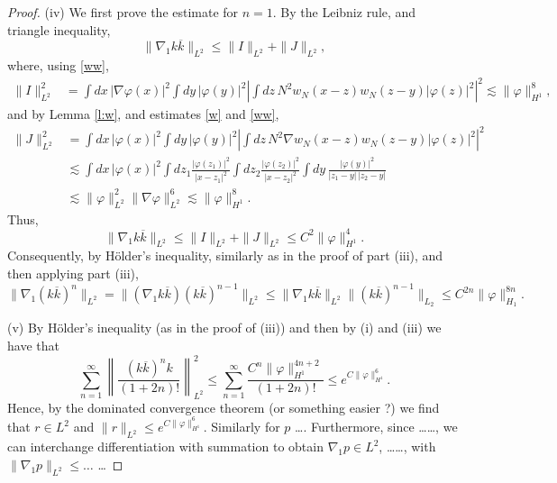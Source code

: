 \documentclass[a4paper,11pt]{article}
\begin{document}
\begin{proof}
  (iv) We first prove the estimate for $n=1$. By the Leibniz rule, and
  triangle inequality,
  \begin{displaymath}
    \| \nabla_1 k \overline{k} \|_{L^2} \le \| I \|_{L^2} + \| J \|_{L^2},
  \end{displaymath}
  where, using \eqref{ww},
  \begin{align*}
    \| I \|_{L^2}^2 & = \int dx \, |\nabla \varphi(x)|^2 \int dy \,
    |\varphi(y)|^2 \left| \int dz \, N^2 w_N(x-z) w_N(z-y) |\varphi(z)|^2
    \right|^2 \apprle \| \varphi \|_{H^1}^8,
  \end{align*}
  and by Lemma \ref{l:w}, and estimates \eqref{w} and \eqref{ww},
  \begin{align*}
    \| J \|_{L^2}^2 & = \int dx \, |\varphi(x)|^2 \int dy \, |\varphi(y)|^2
    \left| \int dz \, N^2 \nabla w_N(x-z) w_N(z-y) |\varphi(z)|^2 \right|^2 \\
    & \apprle \int dx \, |\varphi(x)|^2 \int dz_1
    \frac{|\varphi(z_1)|^2}{|x-z_1|^2} \int dz_2
    \frac{|\varphi(z_2)|^2}{|x-z_2|^2} \int dy \,
    \frac{|\varphi(y)|^2}{|z_1-y| \, |z_2-y|} \\
    & \apprle \| \varphi \|_{L^2}^2 \| \nabla \varphi \|_{L^2}^6 \apprle \|
    \varphi \|_{H^1}^8.
  \end{align*}
  Thus,
  \begin{displaymath}
    \| \nabla_1 k \overline{k} \|_{L^2} \le \| I \|_{L^2} + \| J \|_{L^2}
    \le C^2 \| \varphi \|_{H^1}^4.
  \end{displaymath}
  Consequently, by H\"older's inequality, similarly as in the proof of part
  (iii), and then applying part (iii),
  \begin{displaymath}
    \| \nabla_1 (k \overline{k})^n \|_{L^2} = \| (\nabla_1 k \overline{k}) (k
    \overline{k})^{n-1} \|_{L^2} \le \| \nabla_1 k \overline{k} \|_{L^2} \| (k
    \overline{k})^{n-1} \|_{L_2} \le C^{2n} \| \varphi \|_{H_1}^{8n}.
  \end{displaymath}


  (v) By H\"older's inequality (as in the proof of (iii)) and then by (i) and
  (iii) we have that
  \begin{displaymath}
    \sum_{n=1}^\infty \left \| \frac{(k \overline{k})^n k}{(1+2n)!} \right
    \|_{L^2}^2 \le \sum_{n=1}^\infty \frac{C^n \| \varphi
    \|_{H^1}^{4n+2}}{(1+2n)!} \le e^{C \| \varphi \|_{H^1}^6}.
  \end{displaymath}
  Hence, by the dominated convergence theorem (or something easier ?) we find
  that $r \in L^2$ and $\| r \|_{L^2} \le e^{C \| \varphi \|_{H^1}^6}$.
  Similarly for $p$ \dots. Furthermore, since \dots \dots, we can interchange
  differentiation with summation to obtain $\nabla_1 p \in L^2$, \dots \dots,
  with $\| \nabla_1 p \|_{L^2} \le \dots$ \dots
\end{proof}
\end{document}
